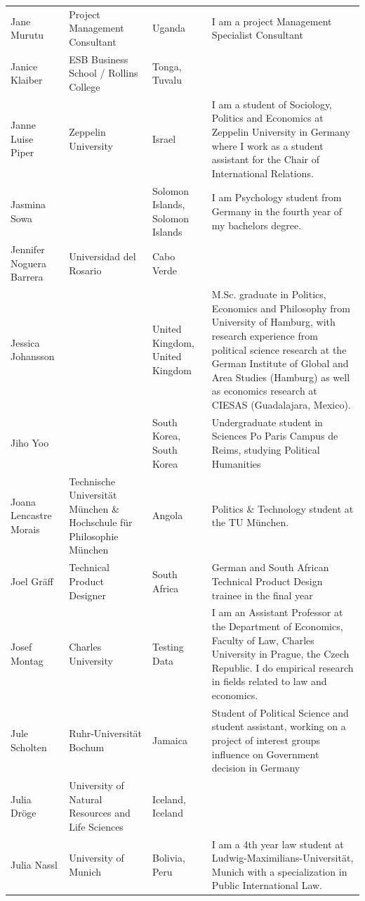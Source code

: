 \documentclass[]{article}
\begin{document}
\begin{longtable}{l>{\raggedright\arraybackslash}p{2cm}>{\raggedright\arraybackslash}p{2cm}>{\raggedright\arraybackslash}p{3cm}}
\rowcolor{gray!6}  Jane Murutu & Project Management Consultant & Uganda & I am a project Management Specialist Consultant\\
Janice Klaiber & ESB Business School / Rollins College & Tonga, Tuvalu & \\
\rowcolor{gray!6}  Janne Luise Piper & Zeppelin University & Israel & I am a student of Sociology, Politics and Economics at Zeppelin University in Germany where I work as a student assistant for the Chair of International Relations.\\
\addlinespace
Jasmina Sowa &  & Solomon Islands, Solomon Islands & I am Psychology student from Germany in the fourth year of my bachelors degree.\\
\rowcolor{gray!6}  Jennifer Noguera Barrera & Universidad del Rosario & Cabo Verde & \\
Jessica Johansson &  & United Kingdom, United Kingdom & M.Sc. graduate in Politics, Economics and Philosophy from University of Hamburg, with research experience from political science research at the German Institute of Global and Area Studies (Hamburg) as well as economics research at CIESAS (Guadalajara, Mexico).\\
\rowcolor{gray!6}  Jiho Yoo &  & South Korea, South Korea & Undergraduate student in Sciences Po Paris Campus de Reims, studying Political Humanities\\
Joana Lencastre Morais & Technische Universität München \& Hochschule für Philosophie München & Angola & Politics \& Technology student at the TU München.\\
\addlinespace
\rowcolor{gray!6}  Joel Gräff & Technical Product Designer & South Africa & German and South African Technical Product Design trainee in the final year\\
Josef Montag & Charles University & Testing Data & I am an Assistant Professor at the Department of Economics, Faculty of Law, Charles University in Prague, the Czech Republic. I do empirical research in fields related to law and economics.\\
\rowcolor{gray!6}  Jule Scholten & Ruhr-Universität Bochum & Jamaica & Student of Political Science and student assistant, working on a project of interest groups influence on Government decision in Germany\\
Julia Dröge & University of Natural Resources and Life Sciences & Iceland, Iceland & \\
\rowcolor{gray!6}  Julia Nassl & University of Munich & Bolivia, Peru & I am a 4th year law student at Ludwig-Maximilians-Universität, Munich with a specialization in Public International Law.\\

\end{longtable}
\end{document}
